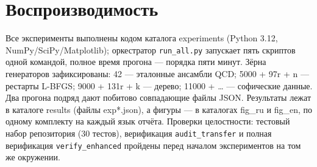 \documentclass[11pt,a4paper]{article}
\begin{document}
\section{Воспроизводимость}\label{sec:repro}

Все эксперименты выполнены кодом каталога experiments (Python 3.12,
NumPy/SciPy/Matplotlib); оркестратор \texttt{run\_all.py} запускает пять
скриптов одной командой, полное время прогона --- порядка пяти минут. Зёрна
генераторов зафиксированы: 42 --- эталонные ансамбли QCD; 5000 + 97r + n ---
рестарты L-BFGS; 9000 + 131r + k --- дерево; 11000 + \ldots{} --- софические
данные. Два прогона подряд дают побитово совпадающие файлы JSON. Результаты
лежат в каталоге results (файлы exp*.json), а фигуры --- в каталогах
fig\_ru и fig\_en, по одному комплекту на каждый язык отчёта.
Проверки целостности: тестовый набор репозитория (30 тестов), верификация
\texttt{audit\_transfer} и полная верификация \texttt{verify\_enhanced}
пройдены перед началом экспериментов на том же окружении.
\end{document}
